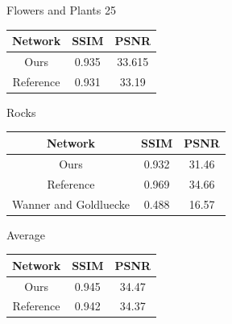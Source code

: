 \documentclass[10pt,twocolumn,letterpaper]{article}
\begin{document}
\begin{center}
Flowers and Plants 25

\begin{tabular}{|c c c|}
    Network & SSIM & PSNR \\ \hline
    Ours & 0.935 & 33.615 \\
    Reference & 0.931 & 33.19 \\ 
\end{tabular}
\end{center}
            
\begin{center}
Rocks

\begin{tabular}{|c c c|}
    Network & SSIM & PSNR \\ \hline
    Ours & 0.932 & 31.46 \\
    Reference & 0.969 & 34.66 \\ 
    Wanner and Goldluecke & 0.488 & 16.57 
\end{tabular}
\end{center}

\begin{center}
Average

\begin{tabular}{|c c c|}
    Network & SSIM & PSNR \\ \hline
    Ours & 0.945 & 34.47 \\
    Reference & 0.942 & 34.37 \\ 
\end{tabular}
\end{center}
\end{document}

